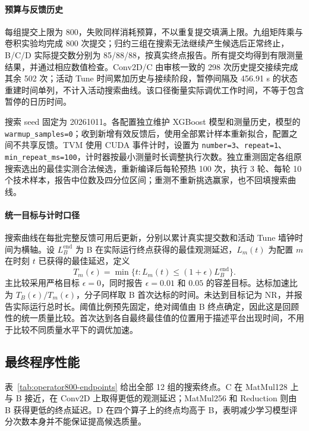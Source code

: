 \paragraph{预算与反馈历史}
每组提交上限为 800，失败同样消耗预算，不以重复提交填满上限。九组矩阵乘与卷积实验均完成 800 次提交；归约三组在搜索无法继续产生候选后正常终止，B/C/D 实际提交数分别为 85/88/88，按真实终点报告。所有提交均得到有限测量结果，并通过相应数值检查。Conv2D/C 由审核一致的 298 次历史提交接续完成其余 502 次；活动 Tune 时间累加历史与接续阶段，暂停间隔及 456.91 s 的状态重建时间单列，不计入活动搜索曲线。该口径衡量实际调优工作时间，不等于包含暂停的日历时间。

搜索 seed 固定为 20261011。各配置独立维护 XGBoost 模型和测量历史，模型的 \texttt{warmup\_samples=0}；收到新增有效反馈后，使用全部累计样本重新拟合，配置之间不共享反馈。TVM 使用 CUDA 事件计时，设置为 \texttt{number=3}、\texttt{repeat=1}、\texttt{min\_repeat\_ms=100}，计时器按最小测量时长调整执行次数。独立重测固定各组原搜索选出的最佳实测合法候选，重新编译后每轮预热 100 次，执行 3 轮、每轮 10 个技术样本，报告中位数及四分位区间；重测不重新挑选赢家，也不回填搜索曲线。

\paragraph{统一目标与计时口径}
搜索曲线在每批完整反馈可用后更新，分别以累计真实提交数和活动 Tune 墙钟时间为横轴。设 $L_B^{\mathrm{end}}$ 为 B 在实际运行终点获得的最佳观测延迟，$L_m(t)$ 为配置 $m$ 在时刻 $t$ 已获得的最佳延迟，定义
\begin{equation}
T_m(\epsilon)=\min\{t:L_m(t)\le(1+\epsilon)L_B^{\mathrm{end}}\}.
\label{eq:target-time}
\end{equation}
主比较采用严格目标 $\epsilon=0$，同时报告 $\epsilon=0.01$ 和 $0.05$ 的容差目标。达标加速比为 $T_B(\epsilon)/T_m(\epsilon)$，分子同样取 B 首次达标的时间。未达到目标记为 NR，并报告实际运行总时长。阈值比例预先固定，绝对阈值由 B 终点确定，因此这是回顾性的统一质量比较。首次达到各自最终最佳值的位置用于描述平台出现时间，不用于比较不同质量水平下的调优加速。

\subsection{最终程序性能}
\label{sec:operator-performance}
表~\ref{tab:operator800-endpoints} 给出全部 12 组的搜索终点。C 在 MatMul128 上与 B 接近，在 Conv2D 上取得更低的观测延迟；MatMul256 和 Reduction 则由 B 获得更低的终点延迟。D 在四个算子上的终点均高于 B，表明减少学习模型评分次数本身并不能保证提高候选质量。

